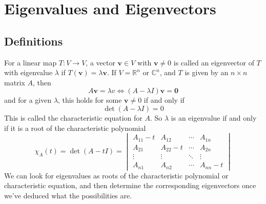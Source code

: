 \documentclass{article}
\begin{document}
\section{Eigenvalues and Eigenvectors}
\subsection{Definitions}
For a linear map $T\colon V \to V$, a vector $\bm v \in V$ with $\bm v \neq 0$ is called an eigenvector of $T$ with eigenvalue $\lambda$ if $T(\bm v) = \lambda \bm v$. If $V = \mathbb R^n$ or $\mathbb C^n$, and $T$ is given by an $n \times n$ matrix $A$, then
\[ A\bm v = \lambda v \iff (A - \lambda I)\bm v = \bm 0 \]
and for a given $\lambda$, this holds for some $\bm v \neq 0$ if and only if
\[ \det(A - \lambda I) = 0 \]
This is called the characteristic equation for $A$. So $\lambda$ is an eigenvalue if and only if it is a root of the characteristic polynomial
\[ \chi_A(t) = \det(A - tI) = \begin{vmatrix}
		A_{11} - t & A_{12}     & \cdots & A_{1n}     \\
		A_{21}     & A_{22} - t & \cdots & A_{2n}     \\
		\vdots     & \vdots     & \ddots & \vdots     \\
		A_{n1}     & A_{n2}     & \cdots & A_{nn} - t
	\end{vmatrix} \]
We can look for eigenvalues as roots of the characteristic polynomial or characteristic equation, and then determine the corresponding eigenvectors once we've deduced what the possibilities are.
\end{document}
